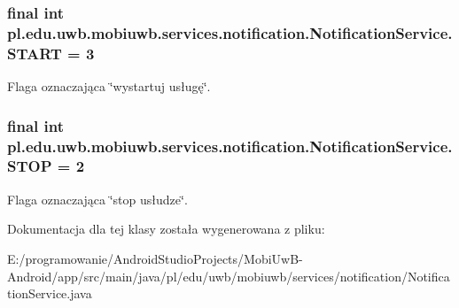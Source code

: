 \subsubsection[{S\+T\+A\+R\+T}]{\setlength{\rightskip}{0pt plus 5cm}final int pl.\+edu.\+uwb.\+mobiuwb.\+services.\+notification.\+Notification\+Service.\+S\+T\+A\+R\+T = 3\hspace{0.3cm}{\ttfamily [static]}}\label{classpl_1_1edu_1_1uwb_1_1mobiuwb_1_1services_1_1notification_1_1_notification_service_ae57cee289223135a2aaf9c711f54b689}
Flaga oznaczająca \char`\"{}wystartuj usługę\char`\"{}. \hypertarget{classpl_1_1edu_1_1uwb_1_1mobiuwb_1_1services_1_1notification_1_1_notification_service_ae809e18e9060af52219971019a948626}{}
\subsubsection[{S\+T\+O\+P}]{\setlength{\rightskip}{0pt plus 5cm}final int pl.\+edu.\+uwb.\+mobiuwb.\+services.\+notification.\+Notification\+Service.\+S\+T\+O\+P = 2\hspace{0.3cm}{\ttfamily [static]}}\label{classpl_1_1edu_1_1uwb_1_1mobiuwb_1_1services_1_1notification_1_1_notification_service_ae809e18e9060af52219971019a948626}
Flaga oznaczająca \char`\"{}stop usłudze\char`\"{}. 

Dokumentacja dla tej klasy została wygenerowana z pliku\+:\begin{DoxyCompactItemize}
\item 
E\+:/programowanie/\+Android\+Studio\+Projects/\+Mobi\+Uw\+B-\/\+Android/app/src/main/java/pl/edu/uwb/mobiuwb/services/notification/Notification\+Service.\+java\end{DoxyCompactItemize}
